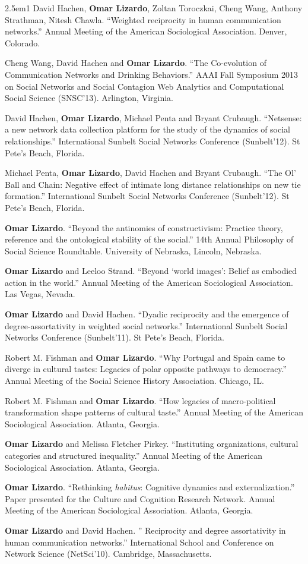 \documentclass[
]{article}
\newenvironment{cventry}{\begin{hangparas}{2.5em}{1}}{\end{hangparas}}
\begin{document}
\begin{cventry}
David Hachen, \textbf{Omar Lizardo}, Zoltan Toroczkai, Cheng Wang,
Anthony Strathman, Nitesh Chawla. ``Weighted reciprocity in human
communication networks.'' Annual Meeting of the American Sociological
Association. Denver, Colorado.

Cheng Wang, David Hachen and \textbf{Omar Lizardo}. ``The Co-evolution
of Communication Networks and Drinking Behaviors.'' AAAI Fall Symposium
2013 on Social Networks and Social Contagion Web Analytics and
Computational Social Science (SNSC'13). Arlington, Virginia.

David Hachen, \textbf{Omar Lizardo}, Michael Penta and Bryant Crubaugh.
``Netsense: a new network data collection platform for the study of the
dynamics of social relationships.'' International Sunbelt Social
Networks Conference (Sunbelt'12). St Pete's Beach, Florida.

Michael Penta, \textbf{Omar Lizardo}, David Hachen and Bryant Crubaugh.
``The Ol' Ball and Chain: Negative effect of intimate long distance
relationships on new tie formation.'' International Sunbelt Social
Networks Conference (Sunbelt'12). St Pete's Beach, Florida.

\textbf{Omar Lizardo}. ``Beyond the antinomies of constructivism:
Practice theory, reference and the ontological stability of the
social.'' 14th Annual Philosophy of Social Science Roundtable.
University of Nebraska, Lincoln, Nebraska.

\textbf{Omar Lizardo} and Leeloo Strand. ``Beyond `world images': Belief
as embodied action in the world.'' Annual Meeting of the American
Sociological Association. Las Vegas, Nevada.

\textbf{Omar Lizardo} and David Hachen. ``Dyadic reciprocity and the
emergence of degree-assortativity in weighted social networks.''
International Sunbelt Social Networks Conference (Sunbelt'11). St Pete's
Beach, Florida.

Robert M. Fishman and \textbf{Omar Lizardo}. ``Why Portugal and Spain
came to diverge in cultural tastes: Legacies of polar opposite pathways
to democracy.'' Annual Meeting of the Social Science History
Association. Chicago, IL.

Robert M. Fishman and \textbf{Omar Lizardo}. ``How legacies of
macro-political transformation shape patterns of cultural taste.''
Annual Meeting of the American Sociological Association. Atlanta,
Georgia.

\textbf{Omar Lizardo} and Melissa Fletcher Pirkey. ``Instituting
organizations, cultural categories and structured inequality.'' Annual
Meeting of the American Sociological Association. Atlanta, Georgia.

\textbf{Omar Lizardo}. ``Rethinking \emph{habitus}: Cognitive dynamics
and externalization.'' Paper presented for the Culture and Cognition
Research Network. Annual Meeting of the American Sociological
Association. Atlanta, Georgia.

\textbf{Omar Lizardo} and David Hachen. '' Reciprocity and degree
assortativity in human communication networks.'' International School
and Conference on Network Science (NetSci'10). Cambridge, Massachusetts.

\end{cventry}
\end{document}
